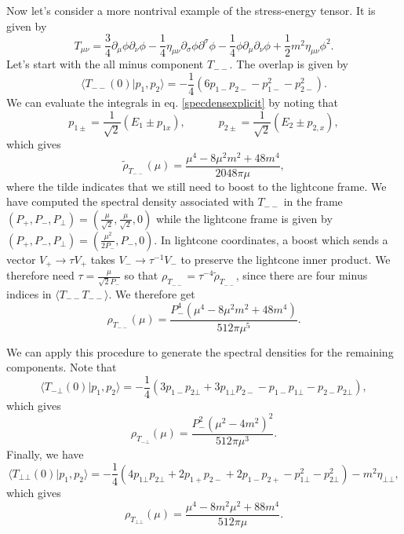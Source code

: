 Now let's consider a more nontrival example of the stress-energy tensor. It is 
given by 
\begin{equation}
    T_{\mu\nu} = \frac{3}{4} \partial_\mu \phi \partial_\nu \phi - \frac{1}{4} \eta_{\mu\nu} \partial_{\sigma} \phi \partial^\sigma \phi - \frac{1}{4} \phi \partial_\mu \partial_\nu \phi + \frac{1}{2}m^2 \eta_{\mu\nu} \phi^2.
\end{equation} 
Let's start with the all minus component $T_{--}$. The overlap is given by 
\begin{equation}
    \langle T_{--}(0) | p_1, p_2 \rangle = - \frac{1}{4} \left(6 p_{1-} p_{2-} - p_{1-}^2 - p_{2-}^2 \right).
\end{equation} 
We can evaluate the integrals in eq. \eqref{specdensexplicit} by noting that 
\begin{equation}
    p_{1 \pm} = \frac{1}{\sqrt{2}} (E_1 \pm p_{1x}), \quad\quad\quad p_{2 \pm} = \frac{1}{\sqrt{2}}(E_2 \pm p_{2,x}),
\end{equation} 
which gives 
\begin{equation}
    \tilde{\rho}_{T_{--}}(\mu) = \frac{\mu^4 - 8 \mu^2 m^2 + 48 m^4}{2048 \pi \mu},
\end{equation} 
where the tilde indicates that we still need to boost to the lightcone frame. We 
have computed the spectral density associated with $T_{--}$ in the frame 
$(P_+, P_-, P_\bot) =\left( \frac{\mu}{\sqrt{2}}, \frac{\mu}{\sqrt{2}}, 0 \right)$ 
while the lightcone frame is given by 
$(P_+, P_-, P_\bot) =\left( \frac{\mu^2}{2P_-},P_-, 0 \right)$. In lightcone 
coordinates, a boost which sends a vector $V_+ \to \tau V_+$ takes 
$V_- \to \tau^{-1} V_-$ to preserve the lightcone inner product. We therefore 
need $\tau = \frac{\mu}{\sqrt{2} P_-}$ so that 
$\rho_{T_{--}} = \tau^{-4} \tilde{\rho}_{T_{--}}$, since there are four minus 
indices in $\langle T_{--} T_{--} \rangle$. We therefore get 
\begin{equation}
    \boxed{ \rho_{T_{--}}(\mu) = \frac{P_-^4 (\mu^4 - 8 \mu^2 m^2 + 48 m^4)}{512 \pi \mu^5} .}
\end{equation}

We can apply this procedure to generate the spectral densities for the remaining 
components. Note that 
\begin{equation}
    \langle T_{-\bot}(0) | p_1, p_2 \rangle = -\frac{1}{4}(3p_{1-} p_{2\bot} + 3p_{1\bot} p_{2-} - p_{1-} p_{1\bot}- p_{2-} p_{2\bot}),
\end{equation} 
which gives 
\begin{equation}
    \boxed{ \rho_{T_{-\bot}}(\mu) = \frac{P_-^2 (\mu^2 - 4m^2)^2}{512 \pi \mu^3} .}
\end{equation} 
Finally, we have 
\begin{equation}
    \langle T_{\bot \bot}(0) | p_1, p_2 \rangle = -\frac{1}{4}(4p_{1\bot} p_{2\bot} + 2p_{1+}p_{2-} + 2p_{1-} p_{2+} - p_{1\bot}^2-p_{2\bot}^2) - m^2 \eta_{\bot\bot},
\end{equation} 
which gives 
\begin{equation}
    \boxed{ \rho_{T_{\bot\bot}}(\mu) = \frac{\mu^4 - 8 m^2 \mu^2 + 88 m^4}{512 \pi \mu} .}
\end{equation}


